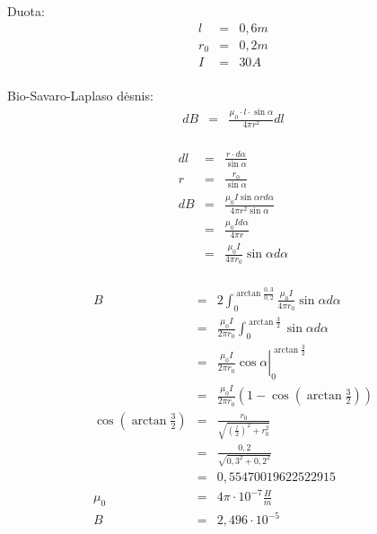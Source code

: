 \begin{exmp}
  Duota:
  \begin{align*}
    l &=& 0,6 m \\
    r_{0} &=& 0,2 m \\
    I &=& 30 A \\
  \end{align*}

  Bio-Savaro-Laplaso dėsnis:
  \begin{align*}
    dB &=& \frac{\mu_{0} \cdot l \cdot \sin \alpha}{4\pi r^2} dl \\
  \end{align*}
  
  \begin{align*}
    dl &=& \frac{r \cdot d \alpha}{\sin \alpha} \\
    r &=& \frac{r_{0}}{\sin \alpha} \\
    d B &=& \frac{\mu_{0} I \sin \alpha r d \alpha
      }{4 \pi r^2 \sin \alpha} \\
    &=& \frac{\mu_{0} I d \alpha}{4 \pi r} \\
    &=& \frac{\mu_{0} I}{4 \pi r_{0}} \sin \alpha d \alpha \\
  \end{align*}

  \begin{align*}
    B &=&
      2 \int _{0} ^{\arctan \frac{0,3}{0,2}}
      \frac{\mu_{0} I}{4 \pi r_{0}} \sin \alpha d \alpha \\
    &=& \frac{\mu_{0} I}{2 \pi r_{0}} \int _{0} ^{\arctan \frac{3}{2}}
      \sin \alpha d \alpha \\
    &=& \left. \frac{\mu_{0} I}{2 \pi r_{0}} \cos \alpha 
    \right| _{0} ^{\arctan \frac{3}{2}} \\
    &=& \frac{\mu_{0} I}{2 \pi r_{0}}
      \left( 1 - \cos\left( \arctan \frac{3}{2} \right) \right) \\
    \cos\left( \arctan \frac{3}{2} \right)
    &=& \frac{r_{0}}{\sqrt{\left(\frac{l}{2}\right)^{2} + r_{0}^{2}}} \\
    &=& \frac{0,2}{\sqrt{0,3^{2} + 0,2^{2}}} \\
    &=& 0,55470019622522915 \\ %
    \mu_{0} &=& 4 \pi \cdot 10^{-7} \frac{H}{m} \\
    B &=& 2,496 \cdot 10^{-5} %
  \end{align*}
\end{exmp}
